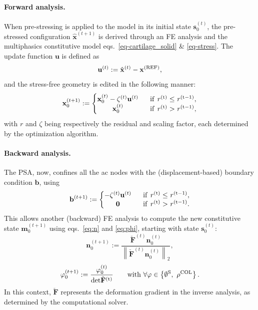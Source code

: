 \documentclass[12pt,a4paper]{report}
\begin{document}
\paragraph{Forward analysis.} When pre-stressing is applied to the model in its initial state $\mathbf{s}^{(t)}_0$, the pre-stressed configuration $\hat{\mathbf{x}}^{(t+1)}$ is derived through an FE analysis and the multiphasics constitutive model eqs.~\ref{eq-cartilage_solid} \& \ref{eq-stress}. The update function $\mathbf{u}$ is defined as
%
\begin{equation}
    \mathbf{u}^{(t)} := \hat{\mathbf{x}}^{(t)}-\mathbf{x}^{\rm{(REF)}},
\end{equation}
%
and the stress-free geometry is edited in the following manner:
%
\begin{equation}
    \mathbf{x}_{0}^{(t+1)} := \left\{\begin{matrix}
    \mathbf{x}_{0}^{(t)} - \zeta^{(t)} \mathbf{u}^{(t)}  & \ \ \rm{if} \ \mathit{r}^{(t)} \leq \mathit{r}^{(t-1)},\\ 
    \mathbf{x}_{0}^{(t)} & \ \ \rm{if} \ \mathit{r}^{(t)} > \mathit{r}^{(t-1)},
    \end{matrix}\right.
\end{equation}
%
with $r$ and $\zeta$ being respectively the residual and scaling factor, each determined by the optimization algorithm.

\paragraph{Backward analysis.} The PSA, now, confines all the \ac{ac} nodes with the (displacement-based) boundary condition $\mathbf{b}$, using
%
\begin{equation}
    \mathbf{b}^{(t+1)} := \left\{\begin{matrix}
     - \zeta^{(t)}\mathbf{u}^{(t)} & \ \ \rm{if} \ \mathit{r}^{(t)} \leq \mathit{r}^{(t-1)},\\ 
    \mathbf{0} & \ \ \rm{if} \ \mathit{r}^{(t)} > \mathit{r}^{(t-1)}.
    \end{matrix}\right.
\end{equation}
%
This allows another (backward) FE analysis to compute the new constitutive state $\mathbf{m}_0^{(t+1)}$ using eqs.~\ref{eq:n} and \ref{eq:phi}, starting with state $\mathbf{s}_0^{(t)}$:
%
\begin{equation}
    \mathbf{n}_{0}^{(t+1)} := \frac{\check{\mathbf{F}}^{(t)}\mathbf{n}_0^{(t)}}{\left \|\check{\mathbf{F}}^{(t)}\mathbf{n}_0^{(t)} \right \|_2},
\end{equation}
%
\begin{equation}
    \varphi_{0}^{(t+1)} := \frac{\varphi_0^{(t)}}{\rm{det}\check{\mathbf{F}}^{(t)}} 
    \qquad \text{with } \forall \varphi \in \left\{\emptyset^{\rm{S}},\ \rho^{\rm{COL}}\right\}.
\end{equation}
%
In this context, $\check{\mathbf{F}}$ represents the deformation gradient in the inverse analysis, as determined by the computational solver.
\end{document}
